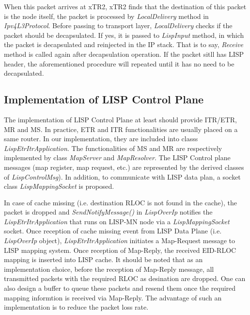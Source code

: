 When this packet arrives at xTR2, xTR2 finds that the destination of this packet is the node itself, the packet is processed by \emph{LocalDelivery} method in \emph{Ipv4L3Protocol}. Before passing to transport layer, \emph{LocalDelivery} checks if the packet should be decapsulated. If yes, it is passed to \emph{LispInput} method, in which the packet is decapsulated and reinjected in the IP stack. That is to say, \emph{Receive} method is called again after decapsulation operation. If the packet sitll has LISP header, the aforementioned procedure will repeated until it has no need to be decapsulated.

\subsection{Implementation of LISP Control Plane}
\label{subsec:control-plane-impl}
The implementation of LISP Control Plane at least should provide ITR/ETR, MR and MS. In practice, ETR and ITR functionalities are usually placed on a same router. In our implementation, they are included into classs \emph{LispEtrItrApplication}.
The functionalities of MS and MR are respectively implemented by class \emph{MapServer} and \emph{MapResolver}. The LISP Control plane messages (map register, map request, etc.) are represented by the derived classes of \emph{LispControlMsg}). In addition, to communicate with LISP data plan, a socket class \emph{LispMappingSocket} is proposed.

In case of cache missing (i.e. destination RLOC is not found in the cache), the packet is dropped and \emph{SendNotifyMessage()} in \emph{LispOverIp} notifies the \emph{LispEtrItrApplication} that runs on LISP-MN node via a \emph{LispMappingSocket} socket. Once reception of cache missing event from LISP Data Plane (i.e. \emph{LispOverIp} object), \emph{LispEtrItrApplication} initiates a Map-Request message to LISP mapping system. Once reception of Map-Reply, the received EID-RLOC mapping is inserted into LISP cache. It should be noted that as an implementation choice, before the reception of Map-Reply message, all transmitted packets with the required RLOC as desination are dropped. One can also design a buffer to queue these packets and resend them once the required mapping informtion is received via Map-Reply. The advantage of such an implementation is to reduce the packet loss rate.

